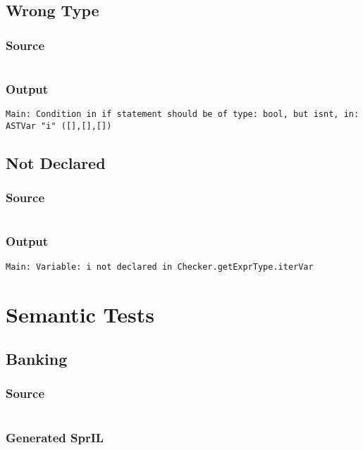 \documentclass[twoside]{report}
\begin{document}
\section{Wrong Type}
\subsection{Source}
\inputminted[tabsize=4,linenos,firstnumber=1]{text}{../../src/haskell/PP-project-2016/test/wrong_type.shl}
\subsection{Output}
\begin{verbatim}
Main: Condition in if statement should be of type: bool, but isnt, in: ASTVar "i" ([],[],[])
\end{verbatim}

\section{Not Declared}
\subsection{Source}
\inputminted[tabsize=4,linenos,firstnumber=1]{text}{../../src/haskell/PP-project-2016/test/not_declared.shl}
\subsection{Output}
\begin{verbatim}
Main: Variable: i not declared in Checker.getExprType.iterVar
\end{verbatim}


\chapter{Semantic Tests}

\section{Banking}
\subsection{Source}
\inputminted[tabsize=4,linenos,firstnumber=1]{text}{../../src/haskell/PP-project-2016/test/banking.shl}
\subsection{Generated SprIL}
\inputminted[tabsize=4,linenos,firstnumber=0]{text}{../../src/haskell/PP-project-2016/test/banking_gen.txt}
\end{document}
